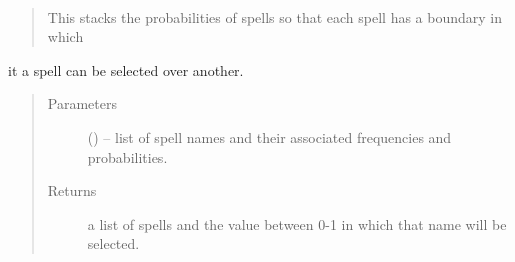 \documentclass[letterpaper,10pt,english]{sphinxmanual}
\begin{document}
\begin{fulllineitems}
\label{\detokenize{code:hp_spells.generateScale}}~\begin{quote}

This stacks the probabilities of spells so that each spell has a boundary in which
\end{quote}

it a spell can be selected over another.
\begin{quote}\begin{description}
\item[{Parameters}] \leavevmode
{} (\sphinxstyleliteralemphasis{}\sphinxstyleliteralemphasis{{[}}\sphinxstyleliteralemphasis{}\sphinxstyleliteralemphasis{{[}}\sphinxstyleliteralemphasis{}\sphinxstyleliteralemphasis{{[}}\sphinxstyleliteralemphasis{,}\sphinxstyleliteralemphasis{{]}}\sphinxstyleliteralemphasis{}\sphinxstyleliteralemphasis{,}\sphinxstyleliteralemphasis{,}\sphinxstyleliteralemphasis{{]}}\sphinxstyleliteralemphasis{{]}}\sphinxstyleliteralemphasis{}) -- list of spell names and their associated frequencies and probabilities.

\item[{Returns}] \leavevmode
a list of spells and the value between 0-1 in which that name will be selected.

\end{description}\end{quote}

\end{fulllineitems}

\end{document}
